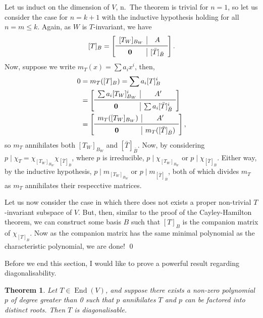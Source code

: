 \documentclass[
]{article}
\newtheorem{theorem}{Theorem}
\theoremstyle{definition}
\begin{document}
Let us induct on the dimension of \(V\), n.~The theorem is trivial for
\(n = 1\), so let us consider the case for \(n = k + 1\) with the
inductive hypothesis holding for all \(n = m \le k\). Again, as \(W\) is
\(T\)-invariant, we have \[[T]_B = 
    \left[
      \begin{array}{c|c}
        [T_W]_{B_W} & A \\
        \midrule
        \mathbf{0} & [\bar{T}]_{\bar{B}}
      \end{array}
      \right]. \] Now, suppose we write \(m_T(x) = \sum a_i x^i\), then,
\begin{align*}
    0 & = m_T([T]_B) = \sum a_i [T]_B^i \\
      & = \left[
          \begin{array}{c|c}
            \sum a_i [T_W]_{B_W}^i & A' \\
            \midrule
            \mathbf{0} & \sum a_i [\bar{T}]_{\bar{B}}^i
          \end{array}
          \right] \\
      & = \left[
          \begin{array}{c|c}
            m_T([T_W]_{B_W}) & A' \\
            \midrule
            \mathbf{0} & m_T([\bar{T}]_{\bar{B}})
          \end{array}
          \right],
  \end{align*} so \(m_T\) annihilates both \([T_W]_{B_W}\) and
\([\bar{T}]_{\bar{B}}\). Now, by considering
\(p \mid \chi_T = \chi_{[T_W]_{B_W}} \chi_{[\bar{T}]_{\bar{B}}}\), where
\(p\) is irreducible, \(p \mid \chi_{[T_W]_{B_W}}\) or
\(p \mid \chi_{[\bar{T}]_{\bar{B}}}\). Either way, by the inductive
hypothesis, \(p \mid m_{[T_W]_{B_W}}\) or
\(p \mid m_{[\bar{T}]_{\bar{B}}}\), both of which divides \(m_T\) as
\(m_T\) annihilates their respecctive matrices.

Let us now consider the case in which there does not exists a proper
non-trivial \(T\)-invariant subspace of \(V\). But, then, similar to the
proof of the Cayley-Hamilton theorem, we can construct some basis \(B\)
such that \([T]_B\) is the companion matrix of \(\chi_{[T]_B}\). Now as
the companion matrix has the same minimal polynomial as the
characteristic polynomial, we are done! \qed

Before we end this section, I would like to prove a powerful result
regarding diagonalisability.

\begin{theorem}\label{diag_distinct}
  Let \(T \in \mathop{\mathrm{End}}(V)\), and suppose there exists a non-zero polynomial \(p\) of 
  degree greater than 0 such that \(p\) annihilates \(T\) and \(p\) can be 
  factored into distinct roots. Then \(T\) is diagonalisable. 
\end{theorem}
\proof
\end{document}
